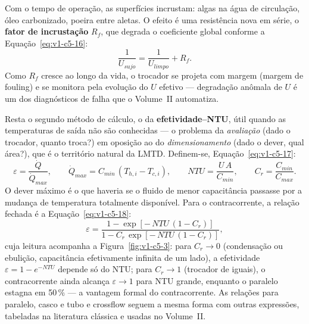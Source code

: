 \documentclass[12pt,a4paper]{article}
\numberwithin{equation}{section}
\numberwithin{table}{section}
\numberwithin{figure}{section}
\begin{document}
Com o tempo de operação, as superfícies incrustam: algas na água de
circulação, óleo carbonizado, poeira entre aletas. O efeito é uma resistência
nova em série, o \textbf{fator de incrustação} $R_f$, que degrada o
coeficiente global conforme a Equação~\eqref{eq:v1-c5-16}:
\begin{equation}\label{eq:v1-c5-16}
\frac{1}{U_{sujo}} = \frac{1}{U_{limpo}} + R_f .
\end{equation}
Como $R_f$ cresce ao longo da vida, o trocador se projeta com margem
(margem de fouling) e se monitora pela evolução do $U$ efetivo ---
degradação anômala de $U$ é um dos diagnósticos de falha que o Volume~II
automatiza.

Resta o segundo método de cálculo, o da \textbf{efetividade--NTU}, útil
quando as temperaturas de saída não são conhecidas --- o problema da
\emph{avaliação} (dado o trocador, quanto troca?) em oposição ao do
\emph{dimensionamento} (dado o dever, qual área?), que é o território natural
da LMTD. Definem-se, Equação~\eqref{eq:v1-c5-17}:
\begin{equation}\label{eq:v1-c5-17}
\varepsilon = \frac{\dot{Q}}{\dot{Q}_{max}},
\qquad
\dot{Q}_{max} = C_{min}\,(T_{h,i} - T_{c,i}),
\qquad
NTU = \frac{U\,A}{C_{min}},
\qquad
C_r = \frac{C_{min}}{C_{max}} .
\end{equation}
O dever máximo é o que haveria se o fluido de menor capacitância passasse por
a mudança de temperatura totalmente disponível. Para o contracorrente, a
relação fechada é a Equação~\eqref{eq:v1-c5-18}:
\begin{equation}\label{eq:v1-c5-18}
\varepsilon = \frac{1 - \exp\!\left[-\,NTU\,(1 - C_r)\right]}
{1 - C_r \, \exp\!\left[-\,NTU\,(1 - C_r)\right]} ,
\end{equation}
cuja leitura acompanha a Figura~\ref{fig:v1-c5-3}: para $C_r \to 0$
(condensação ou ebulição, capacitância efetivamente infinita de um lado), a
efetividade $\varepsilon = 1 - e^{-NTU}$ depende só do NTU; para $C_r \to 1$
(trocador de iguais), o contracorrente ainda alcança $\varepsilon \to 1$ para
NTU grande, enquanto o paralelo estagna em 50\,\% --- a vantagem formal do
contracorrente. As relações para paralelo, casco e tubo e crossflow seguem a
mesma forma com outras expressões, tabeladas na literatura clássica e usadas
no Volume~II.
\end{document}
